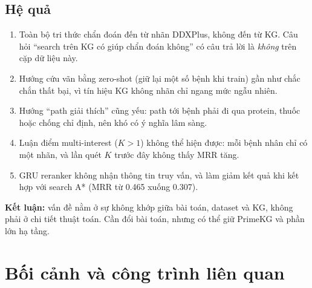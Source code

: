 \documentclass[11pt,a4paper]{article}
\theoremstyle{remark}
\begin{document}
\subsection{Hệ quả}
\begin{enumerate}[nosep]
  \item Toàn bộ tri thức chẩn đoán đến từ nhãn DDXPlus, không đến từ KG. Câu hỏi ``search trên KG có giúp chẩn đoán không'' có câu trả lời là \emph{không} trên cặp dữ liệu này.
  \item Hướng cứu vãn bằng zero-shot (giữ lại một số bệnh khi train) gần như chắc chắn thất bại, vì tín hiệu KG không nhãn chỉ ngang mức ngẫu nhiên.
  \item Hướng ``path giải thích'' cũng yếu: path tới bệnh phải đi qua protein, thuốc hoặc chống chỉ định, nên khó có ý nghĩa lâm sàng.
  \item Luận điểm multi-interest ($K>1$) không thể hiện được: mỗi bệnh nhân chỉ có một nhãn, và lần quét $K$ trước đây không thấy MRR tăng.
  \item GRU reranker không nhận thông tin truy vấn, và làm giảm kết quả khi kết hợp với search A* (MRR từ 0.465 xuống 0.307).
\end{enumerate}
\textbf{Kết luận:} vấn đề nằm ở sự không khớp giữa bài toán, dataset và KG, không phải ở chi tiết thuật toán. Cần đổi bài toán, nhưng có thể giữ PrimeKG và phần lớn hạ tầng.


\section{Bối cảnh và công trình liên quan}
\end{document}
